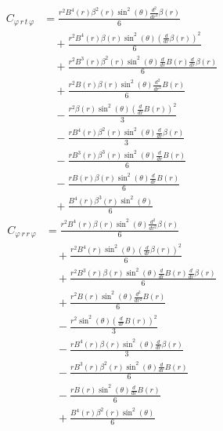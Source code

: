 \documentclass[11pt,a4paper]{article}
\begin{document}
\begin{align*}
  C_{\varphi\,r\,t\,\varphi} &= \frac{r^{2} B^{4}{\left(r \right)} \beta^{2}{\left(r \right)} \sin^{2}{\left(\theta \right)} \frac{d^{2}}{d r^{2}} \beta{\left(r \right)}}{6} \\
  &\quad + \frac{r^{2} B^{4}{\left(r \right)} \beta{\left(r \right)} \sin^{2}{\left(\theta \right)} \left(\frac{d}{d r} \beta{\left(r \right)}\right)^{2}}{6} \\
  &\quad + \frac{r^{2} B^{3}{\left(r \right)} \beta^{2}{\left(r \right)} \sin^{2}{\left(\theta \right)} \frac{d}{d r} B{\left(r \right)} \frac{d}{d r} \beta{\left(r \right)}}{6} \\
  &\quad + \frac{r^{2} B{\left(r \right)} \beta{\left(r \right)} \sin^{2}{\left(\theta \right)} \frac{d^{2}}{d r^{2}} B{\left(r \right)}}{6} \\
  &\quad - \frac{r^{2} \beta{\left(r \right)} \sin^{2}{\left(\theta \right)} \left(\frac{d}{d r} B{\left(r \right)}\right)^{2}}{3} \\
  &\quad - \frac{r B^{4}{\left(r \right)} \beta^{2}{\left(r \right)} \sin^{2}{\left(\theta \right)} \frac{d}{d r} \beta{\left(r \right)}}{3} \\
  &\quad - \frac{r B^{3}{\left(r \right)} \beta^{3}{\left(r \right)} \sin^{2}{\left(\theta \right)} \frac{d}{d r} B{\left(r \right)}}{6} \\
  &\quad - \frac{r B{\left(r \right)} \beta{\left(r \right)} \sin^{2}{\left(\theta \right)} \frac{d}{d r} B{\left(r \right)}}{6} \\
  &\quad + \frac{B^{4}{\left(r \right)} \beta^{3}{\left(r \right)} \sin^{2}{\left(\theta \right)}}{6}
\end{align*}
\begin{align*}
  C_{\varphi\,r\,r\,\varphi} &= \frac{r^{2} B^{4}{\left(r \right)} \beta{\left(r \right)} \sin^{2}{\left(\theta \right)} \frac{d^{2}}{d r^{2}} \beta{\left(r \right)}}{6} \\
  &\quad + \frac{r^{2} B^{4}{\left(r \right)} \sin^{2}{\left(\theta \right)} \left(\frac{d}{d r} \beta{\left(r \right)}\right)^{2}}{6} \\
  &\quad + \frac{r^{2} B^{3}{\left(r \right)} \beta{\left(r \right)} \sin^{2}{\left(\theta \right)} \frac{d}{d r} B{\left(r \right)} \frac{d}{d r} \beta{\left(r \right)}}{6} \\
  &\quad + \frac{r^{2} B{\left(r \right)} \sin^{2}{\left(\theta \right)} \frac{d^{2}}{d r^{2}} B{\left(r \right)}}{6} \\
  &\quad - \frac{r^{2} \sin^{2}{\left(\theta \right)} \left(\frac{d}{d r} B{\left(r \right)}\right)^{2}}{3} \\
  &\quad - \frac{r B^{4}{\left(r \right)} \beta{\left(r \right)} \sin^{2}{\left(\theta \right)} \frac{d}{d r} \beta{\left(r \right)}}{3} \\
  &\quad - \frac{r B^{3}{\left(r \right)} \beta^{2}{\left(r \right)} \sin^{2}{\left(\theta \right)} \frac{d}{d r} B{\left(r \right)}}{6} \\
  &\quad - \frac{r B{\left(r \right)} \sin^{2}{\left(\theta \right)} \frac{d}{d r} B{\left(r \right)}}{6} \\
  &\quad + \frac{B^{4}{\left(r \right)} \beta^{2}{\left(r \right)} \sin^{2}{\left(\theta \right)}}{6}
\end{align*}
\end{document}
